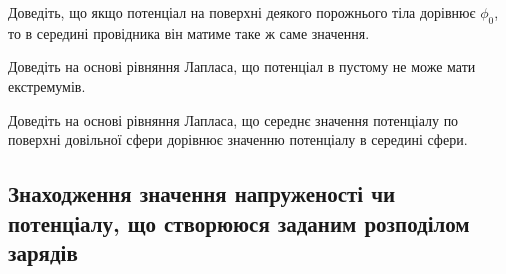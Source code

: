 \begin{problem}
    Доведіть, що якщо потенціал на поверхні деякого порожнього тіла дорівнює $\phi_0$, то в середині провідника він матиме таке ж саме значення.
\end{problem}

\begin{problem}
    Доведіть на основі рівняння Лапласа, що потенціал в пустому не може мати екстремумів.
\end{problem}

\begin{problem}
	Доведіть на основі рівняння Лапласа, що середнє значення потенціалу по поверхні довільної сфери дорівнює значенню потенціалу в середині сфери.
\end{problem}

\subsection*{Знаходження значення напруженості чи потенціалу, що створююся заданим розподілом зарядів}

